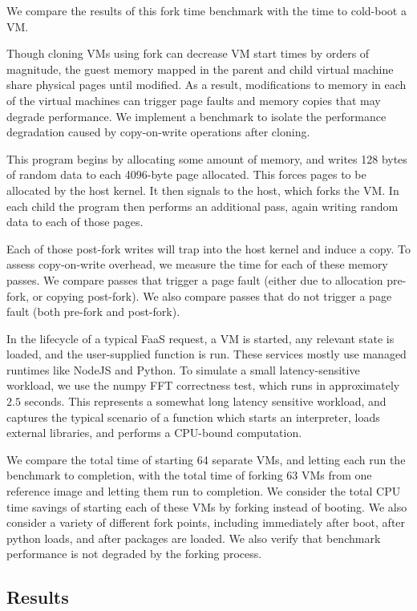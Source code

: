 We compare the results of this fork time benchmark with the time to cold-boot a
VM.

 Though cloning VMs using fork can decrease
VM start times by orders of magnitude, the guest memory mapped in the parent
and child virtual machine share physical pages until modified. As a result,
modifications to memory in each of the virtual machines can trigger page faults
and memory copies that may degrade performance. We implement a benchmark to
isolate the performance degradation caused by copy-on-write operations after
cloning.

This program begins by allocating some amount of memory, and writes 128 bytes
of random data to each 4096-byte page allocated. This forces pages to be
allocated by the host kernel. It then signals to the host, which forks the VM.
In each child the program then performs an additional pass, again writing
random data to each of those pages.

Each of those post-fork writes will trap into the host kernel and induce a
copy. To assess copy-on-write overhead, we measure the time for each of these
memory passes. We compare passes that trigger a page fault (either due to
allocation pre-fork, or copying post-fork). We also compare passes that do not
trigger a page fault (both pre-fork and post-fork).

 In the lifecycle of a typical FaaS request, a VM is
started, any relevant state is loaded, and the user-supplied function is run.
These services mostly use managed runtimes like NodeJS and Python. To simulate
a small latency-sensitive workload, we use the numpy FFT correctness test,
which runs in approximately $2.5$ seconds. This represents a somewhat long
latency sensitive workload, and captures the typical scenario of a function
which starts an interpreter, loads external libraries, and performs a CPU-bound
computation.

We compare the total time of starting 64 separate VMs, and letting each run the
benchmark to completion, with the total time of forking 63 VMs from one
reference image and letting them run to completion. We consider the total CPU
time savings of starting each of these VMs by forking instead of booting. We
also consider a variety of different fork points, including immediately after
boot, after python loads, and after packages are loaded. We also verify that
benchmark performance is not degraded by the forking process.

\subsection{Results}

